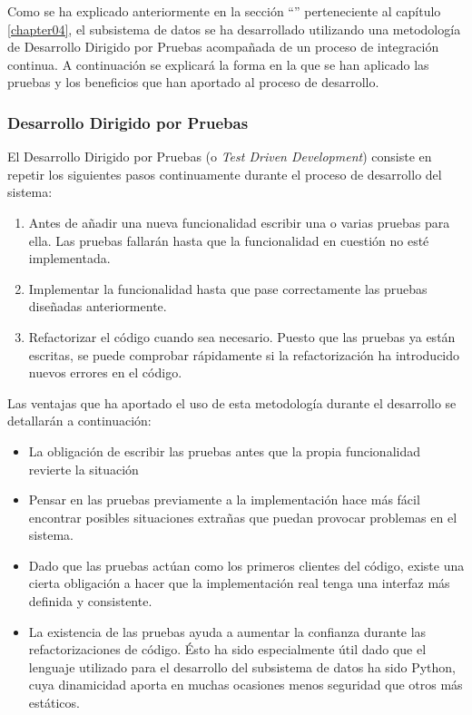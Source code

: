 Como se ha explicado anteriormente en la sección ``'' perteneciente al capítulo \ref{chapter04}, el subsistema de datos se ha desarrollado utilizando una metodología de Desarrollo Dirigido por Pruebas acompañada de un proceso de integración continua.  A continuación se explicará la forma en la que se han aplicado las pruebas y los beneficios que han aportado al proceso de desarrollo.

\subsubsection{Desarrollo Dirigido por Pruebas}
	El Desarrollo Dirigido por Pruebas (o \textit{Test Driven Development}) consiste en repetir los siguientes pasos continuamente durante el proceso de desarrollo del sistema:
	\begin{enumerate}
		\item
			Antes de añadir una nueva funcionalidad escribir una o varias pruebas para ella.  Las pruebas fallarán hasta que la funcionalidad en cuestión no esté implementada.
		\item
			Implementar la funcionalidad hasta que pase correctamente las pruebas diseñadas anteriormente.
		\item
			Refactorizar el código cuando sea necesario.  Puesto que las pruebas ya están escritas, se puede comprobar rápidamente si la refactorización ha introducido nuevos errores en el código.
	\end{enumerate}
	
	Las ventajas que ha aportado el uso de esta metodología durante el desarrollo se detallarán a continuación:
	\begin{itemize}
		\item
			La obligación de escribir las pruebas antes que la propia funcionalidad revierte la situación 
		\item
			Pensar en las pruebas previamente a la implementación hace más fácil encontrar posibles situaciones extrañas que puedan provocar problemas en el sistema.
		\item
			Dado que las pruebas actúan como los primeros clientes del código, existe una cierta obligación a hacer que la implementación real tenga una interfaz más definida y consistente.
		\item
			La existencia de las pruebas ayuda a aumentar la confianza durante las refactorizaciones de código.  Ésto ha sido especialmente útil dado que el lenguaje utilizado para el desarrollo del subsistema de datos ha sido Python, cuya dinamicidad aporta en muchas ocasiones menos seguridad que otros más estáticos.
	\end{itemize}
	
